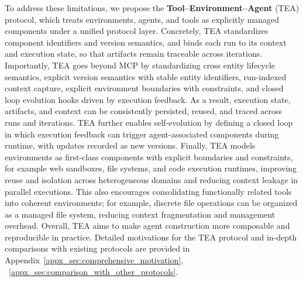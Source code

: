 \documentclass[11pt]{article}
\begin{document}

To address these limitations, we propose the \textbf{Tool–Environment–Agent} (TEA) protocol, which treats environments, agents, and tools as explicitly managed components under a unified protocol layer. Concretely, TEA standardizes component identifiers and version semantics, and binds each run to its context and execution state, so that artifacts remain traceable across iterations. Importantly, TEA goes beyond MCP by standardizing cross entity lifecycle semantics, explicit version semantics with stable entity identifiers, run-indexed context capture, explicit environment boundaries with constraints, and closed loop evolution hooks driven by execution feedback. As a result, execution state, artifacts, and context can be consistently persisted, reused, and traced across runs and iterations. TEA further enables self-evolution by defining a closed loop in which execution feedback can trigger agent-associated components during runtime, with updates recorded as new versions. Finally, TEA models environments as first-class components with explicit boundaries and constraints, for example web sandboxes, file systems, and code execution runtimes, improving reuse and isolation across heterogeneous domains and reducing context leakage in parallel executions. This also encourages consolidating functionally related tools into coherent environments; for example, discrete file operations can be organized as a managed file system, reducing context fragmentation and management overhead. Overall, TEA aims to make agent construction more composable and reproducible in practice. Detailed motivations for the TEA protocol and in-depth comparisons with existing protocols are provided in Appendix~\ref{appx_sec:comprehensive_motivation}, ~\ref{appx_sec:comparison_with_other_protocols}.

\end{document}
